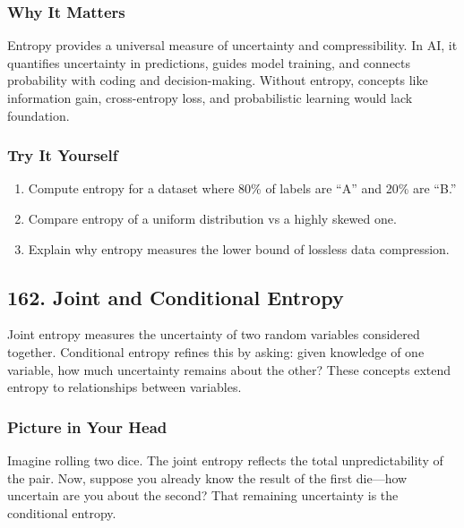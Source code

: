 \documentclass[
  letterpaper,
  DIV=11,
  numbers=noendperiod]{scrreprt}
\providecommand{\tightlist}{%
  \setlength{\itemsep}{0pt}\setlength{\parskip}{0pt}}
\begin{document}
\subsubsection{Why It Matters}\label{why-it-matters-58}

Entropy provides a universal measure of uncertainty and compressibility.
In AI, it quantifies uncertainty in predictions, guides model training,
and connects probability with coding and decision-making. Without
entropy, concepts like information gain, cross-entropy loss, and
probabilistic learning would lack foundation.

\subsubsection{Try It Yourself}\label{try-it-yourself-160}

\begin{enumerate}
\def\labelenumi{\arabic{enumi}.}
\tightlist
\item
  Compute entropy for a dataset where 80\% of labels are ``A'' and 20\%
  are ``B.''
\item
  Compare entropy of a uniform distribution vs a highly skewed one.
\item
  Explain why entropy measures the lower bound of lossless data
  compression.
\end{enumerate}

\subsection{162. Joint and Conditional
Entropy}\label{joint-and-conditional-entropy}

Joint entropy measures the uncertainty of two random variables
considered together. Conditional entropy refines this by asking: given
knowledge of one variable, how much uncertainty remains about the other?
These concepts extend entropy to relationships between variables.

\subsubsection{Picture in Your Head}\label{picture-in-your-head-161}

Imagine rolling two dice. The joint entropy reflects the total
unpredictability of the pair. Now, suppose you already know the result
of the first die---how uncertain are you about the second? That
remaining uncertainty is the conditional entropy.
\end{document}
